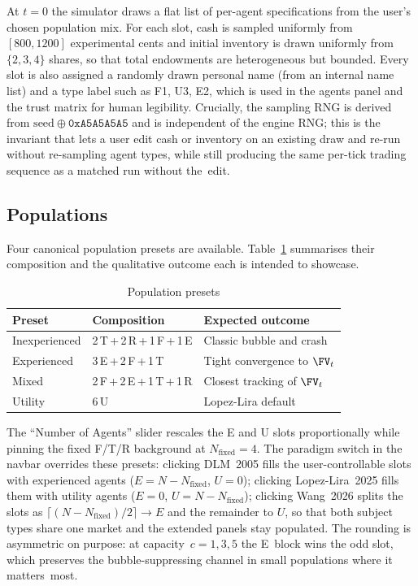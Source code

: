 At $t=0$ the simulator draws a flat list of per-agent specifications
from the user's chosen population mix. For each slot, cash is
sampled uniformly from $[800,1200]$ experimental cents and initial
inventory is drawn uniformly from $\{2,3,4\}$ shares, so that total
endowments are heterogeneous but bounded. Every slot is also
assigned a randomly drawn personal name (from an internal name
list) and a type label such as F1, U3, E2, which is used in the
agents panel and the trust matrix for human legibility. Crucially,
the sampling RNG is derived from $\text{seed}\oplus\mathtt{0xA5A5A5A5}$
and is independent of the engine RNG; this is the
invariant that lets a user edit cash or inventory on an existing
draw and re-run without re-sampling agent types, while still
producing the same per-tick trading sequence as a matched run
without the~edit.

\subsection{Populations}

Four canonical population presets are available. Table~\ref{tab:presets}
summarises their composition and the qualitative outcome each is
intended to showcase.

\begin{table}[h]
\centering
\small
\caption{Population presets}
\label{tab:presets}
\begin{tabular}{l l l}
\toprule
Preset & Composition & Expected outcome \\
\midrule
Inexperienced    & 2\,T\,+\,2\,R\,+\,1\,F\,+\,1\,E               & Classic bubble and crash       \\
Experienced      & 3\,E\,+\,2\,F\,+\,1\,T                        & Tight convergence to $\FV_t$   \\
Mixed            & 2\,F\,+\,2\,E\,+\,1\,T\,+\,1\,R               & Closest tracking of $\FV_t$    \\
Utility          & 6\,U                                          & Lopez-Lira default             \\
\bottomrule
\end{tabular}
\end{table}

The ``Number of Agents'' slider rescales the E and U slots
proportionally while pinning the fixed F/T/R background at
$N_{\text{fixed}}=4$. The paradigm switch in the navbar overrides
these presets: clicking DLM~2005 fills the user-controllable slots
with experienced agents ($E=N-N_{\text{fixed}}$, $U=0$); clicking
Lopez-Lira~2025 fills them with utility agents ($E=0$,
$U=N-N_{\text{fixed}}$); clicking Wang~2026 splits the slots as
$\lceil(N-N_{\text{fixed}})/2\rceil\to E$ and the remainder to $U$, so
that both subject types share one market and the extended panels
stay populated. The rounding is asymmetric on purpose: at
capacity~$c=1,3,5$ the E~block wins the odd slot, which
preserves the bubble-suppressing channel in small populations
where it matters~most.

